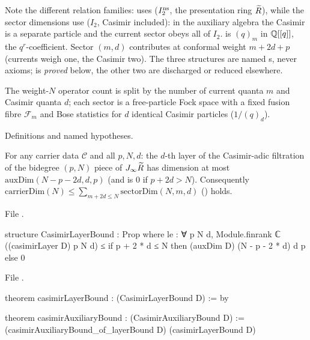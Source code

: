 \begin{dictionary}
Note the different relation families:  uses  ($I_2^{\mathrm{ns}}$, the presentation ring
$\widetilde R$), while the sector dimensions use  ($I_2$, Casimir included): in the auxiliary
algebra the Casimir is a separate particle and the current sector obeys all of $I_2$.  is
$(q)_m$ in ${\mathbb{Q}}[[q]]$,  the $q^r$-coefficient. Sector $(m,d)$ contributes at conformal weight
$m+2d+p$ (currents weigh one, the Casimir two). The three structures are named s, never axioms;
 is \emph{proved} below, the other two are discharged or reduced elsewhere.
\end{dictionary}

\begin{physics}
The weight-$N$ operator count is split by the number of current quanta $m$ and Casimir quanta $d$; each
sector is a free-particle Fock space with a fixed fusion fibre $\mathcal F_m$ and Bose statistics for $d$ identical
Casimir particles ($1/(q)_d$).
\end{physics}

\begin{status}
Definitions and named hypotheses.
\end{status}

\begin{theorem}\label{l24:thm:B1}
For any carrier data $\mathscr C$ and all $p,N,d$: the $d$-th layer of the Casimir-adic filtration of the bidegree
$(p,N)$ piece of $J_\infty\widetilde R$ has dimension at most $\mathrm{auxDim}(N-p-2d,d,p)$ (and is $0$ if $p+2d>N$).
Consequently $\mathrm{carrierDim}(N)\le\sum_{m+2d\le N}\mathrm{sectorDim}(N,m,d)$ () holds.
\end{theorem}
\noindent File .
\begin{leancode}
structure CasimirLayerBound : Prop where
  le : ∀ p N d, Module.finrank ℂ ((casimirLayer D) p N d) ≤
    if p + 2 * d ≤ N then (auxDim D) (N - p - 2 * d) d p else 0
\end{leancode}
\noindent File .
\begin{leancode}
theorem casimirLayerBound : (CasimirLayerBound D) := by

theorem casimirAuxiliaryBound : (CasimirAuxiliaryBound D) :=
  (casimirAuxiliaryBound_of_layerBound D) (casimirLayerBound D)
\end{leancode}

